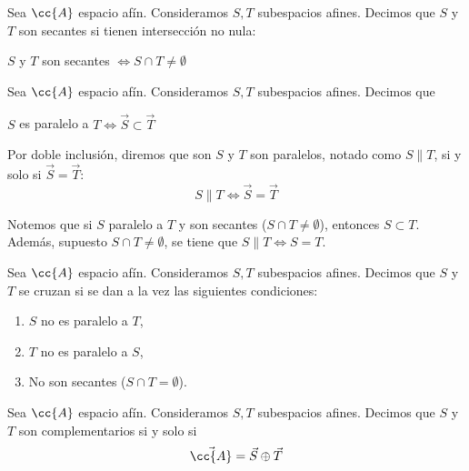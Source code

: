 \begin{definicion}
    Sea $\cc{A}$ espacio afín. Consideramos $S,T$ subespacios afines. Decimos que $S$ y $T$ son secantes si tienen intersección no nula:
    \begin{center}
        $S$ y $T$ son secantes $\Longleftrightarrow S\cap T\neq \emptyset$
    \end{center}
\end{definicion}

\begin{definicion}[Paralelismo]
    Sea $\cc{A}$ espacio afín. Consideramos $S,T$ subespacios afines. Decimos que
    \begin{center}
        $S$ es paralelo a $T \Longleftrightarrow \vec{S}\subset \vec{T}$
    \end{center}

    Por doble inclusión, diremos que son $S$ y $T$ son paralelos, notado como $S\|T$, si y solo si $\vec{S}=\vec{T}$:
    \begin{equation*}
        S\|T\Longleftrightarrow \vec{S}=\vec{T}
    \end{equation*}
\end{definicion}

Notemos que si $S$ paralelo a $T$ y son secantes ($S\cap T\neq \emptyset$), entonces $S\subset T$. Además, supuesto $S\cap T\neq \emptyset$, se tiene que $S\|T\Longleftrightarrow S=T$.

\begin{definicion}
    Sea $\cc{A}$ espacio afín. Consideramos $S,T$ subespacios afines. Decimos que $S$ y $T$ se cruzan si se dan a la vez las siguientes condiciones:
    \begin{enumerate}
        \item $S$ no es paralelo a $T$,
        \item $T$ no es paralelo a $S$,
        \item No son secantes ($S\cap T=\emptyset$).
    \end{enumerate}
\end{definicion}


\begin{definicion}
    Sea $\cc{A}$ espacio afín. Consideramos $S,T$ subespacios afines. Decimos que $S$ y $T$ son complementarios si y solo si
    $$\vec{\cc{A}}=\vec{S}\oplus \vec{T}$$
\end{definicion}


